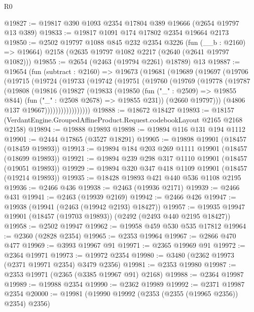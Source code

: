 \begin{lexlean}{R0}
\begin{coremodule}
@19827 := @19817 @390 @1093 @2354 @17804 @389 @19666 (@2654 @19797 @13 @389)
@19833 := @19817 @1091 @174 @17802 @2354 @19664 @2173
@19850 := @2502
    @19797
    @1088
    @845
    @232
    @2354
    @3226
    (fun (__b : @2160) => @19664)
    @2158
    (@2635 @19797 @1082 @2217 (@2640 (@2641 @19797 @1082)))
@19855 := @2654 (@2463 (@19794 @2261) @18789) @13
@19887 := @19654
    (fun (subtract : @2160) =>
    @19673
      (@19681
        (@19689
          (@19697
            (@19706
              (@19715
                (@19724
                  (@19733
                    (@19742
                      (@19751
                        (@19760
                          (@19769
                            (@19778
                              (@19787
                                (@19808
                                  (@19816
                                    (@19827
                                      (@19833
                                        (@19850
                                          (fun ("_" : @2509) => @19855 @844)
                                          (fun ("_" : @2508 @2678) => @19855 @231))
                                        (@2660 @19797)))
                                    (@4806 @137 @19667)))))))))))))))))
@19888 := @18672 @18427
@19893 := @18157 (VerdantEngine.GroupedAffineProduct.Request.codebookLayout @2165 @2168 @2158)
@19894 := @19888 @19893
@19898 := @19894 @116 @131 @194 @1112
@19901 := @2444 @17865 (@3527 @18291)
@19905 := @19898 @19901 (@18457 (@18459 @19893))
@19913 := @19894 @184 @203 @269 @1111 @19901 (@18457 (@18699 @19893))
@19921 := @19894 @239 @298 @317 @1110 @19901 (@18457 (@19051 @19893))
@19929 := @19894 @320 @347 @418 @1109 @19901 (@18457 (@19214 @19893))
@19935 := @18428 @19893 @421 @440 @536 @1108 @2195
@19936 := @2466 @436
@19938 := @2463 (@19936 @2171)
@19939 := @2466 @431
@19941 := @2463 (@19939 @2169)
@19942 := @2466 @426
@19947 := @19938 (@19941 (@2463 (@19942 @2193) @18427))
@19957 := @19935 @19947 @19901 (@18457 (@19703 @19893)) (@2492 (@2493 @440 @2195 @18427))
@19958 := @2502 @19947
@19962 := @19958 @459 @530 @535 @17812
@19964 := @2360 (@2828 @2354)
@19965 := @2353 @19964
@19967 := @2866 @470 @477
@19969 := @3993 @19967 @91
@19971 := @2365 @19969 @91
@19972 := @2364 @19971
@19973 := @19972 @2354
@19980 := @3480 (@2362 @19973 (@2371 @19971 @2354) @3479 @2356)
@19981 := @2353 @19980
@19987 := @2353 @19971 (@2365 (@3385 @19967 @91) @2168)
@19988 := @2364 @19987
@19989 := @19988 @2354
@19990 := @2362 @19989
@19992 := @2371 @19987 @2354
@20000 := @19981 (@19990 @19992 (@2353 (@2355 (@19965 @2356)) @2354) @2356)

\end{coremodule}
\end{lexlean}
